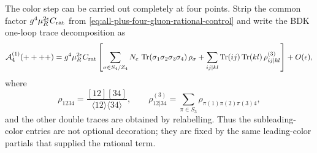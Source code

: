 \begin{controlledapproximation}
\label{ca:all-plus-rational-hard-function-bin}
The color step can be carried out completely at four points.  Strip the common
factor \(g^4\mu_R^{2\epsilon}C_{\rm rat}\) from
\eqref{eq:all-plus-four-gluon-rational-control} and write the BDK one-loop
trace decomposition as
\begin{equation}
  \mathcal A_4^{(1)}(++++)
  =
  g^4\mu_R^{2\epsilon}C_{\rm rat}
  \left[
    \sum_{\sigma\in S_4/Z_4}
      N_c\,\operatorname{Tr}(\sigma_1\sigma_2\sigma_3\sigma_4)\,\rho_\sigma
    +
    \sum_{ij|kl}
      \operatorname{Tr}(i j)\operatorname{Tr}(k l)\,\rho_{ij|kl}^{(3)}
  \right]+O(\epsilon),
  \label{eq:four-point-all-plus-trace-decomposition}
\end{equation}
where
\[
  \rho_{1234}
  =
  \frac{[12][34]}{\langle12\rangle\langle34\rangle},
  \qquad
  \rho_{12|34}^{(3)}
  =
  \sum_{\pi\in S_3}\rho_{\pi(1)\pi(2)\pi(3)4},
\]
and the other double traces are obtained by relabelling.  Thus the
subleading-color entries are not optional decoration; they are fixed by the
same leading-color partials that supplied the rational term.


\end{controlledapproximation}
